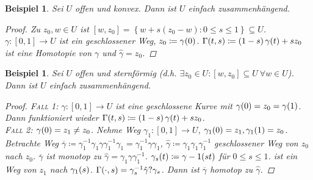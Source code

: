 \documentclass[11pt, a4paper]{article}
\theoremstyle{plain}
\newtheorem{beispiel}[blockelement]{Beispiel}
\numberwithin{equation}{subsection}
\newcommand{\set}[1]{\left\{#1\right\}}
\newcommand{\pair}[1]{\left(#1\right)}
\newcommand{\of}[1]{\mathopen{}\mathclose{}\bgroup\left(#1\aftergroup\egroup\right)}
\newcommand{\interv}[1]{\left[#1\right]}
\begin{document}
    \begin{beispiel}
        Sei $U$ offen und konvex. Dann ist $U$ einfach zusammenhängend.
        \begin{proof}
            Zu $z_0, w\in U$ ist $\interv{w, z_0} = \set{w + s\pair{z_0 - w}: 0 \leq s \leq 1} \subseteq U$. $\gamma: \interv{0, 1}\to U$ ist ein geschlossener Weg, $z_0 \coloneqq \gamma\of{0}$. $\Gamma\of{t, s}\coloneqq \pair{1-s}\gamma\of{t} + s z_0$ ist eine Homotopie von $\gamma$ und $\hat{\gamma} = z_0$.
        \end{proof}
    \end{beispiel}

    \begin{beispiel}
        Sei $U$ offen und sternförmig (d.h. $\exists z_0 \in U: \interv{w, z_0}\subseteq U~\forall w\in U$). Dann ist $U$ einfach zusammenhängend.

        \begin{proof}
            \textsc{Fall 1}: $\gamma: \interv{0,1}\to U$ ist eine geschlossene Kurve mit $\gamma\of{0} = z_0 = \gamma\of{1}$. Dann funktioniert wieder $\Gamma\of{t, s}\coloneqq \pair{1-s}\gamma\of{t} + s z_0$.\\
            \textsc{Fall 2}: $\gamma\of{0} = z_1 \neq z_0$. Nehme Weg $\gamma_1: \interv{0, 1}\to U$, $\gamma_1\of{0} = z_1, \gamma_1\of{1} = z_0$. Betrachte Weg $\overline{\gamma}\coloneqq \gamma_1^{-1}\gamma_1 \gamma \gamma_1^{-1}\gamma_1 = \gamma_1^{-1} \gamma\gamma_1$, $\hat{\gamma} \coloneqq \gamma_1 \gamma_1 \gamma_1^{-1}$ geschlossener Weg von $z_0$ nach $z_0$. $\overline{\gamma}$ ist monotop zu $\hat{\gamma} = \gamma_1 \gamma \gamma_1^{-1}$. $\gamma_s\of{t}\coloneqq \gamma-1\of{st}$ für $0\leq s \leq 1$. ist ein Weg von $z_1$ nach $\gamma_1\of{s}$. $\Gamma\of{\cdot, s} = \gamma_s^{-1}\hat{\gamma}?\gamma_s$. Dann ist $\overline{\gamma}$ homotop zu $\hat{\gamma}$.
        \end{proof}
    \end{beispiel}
\end{document}
